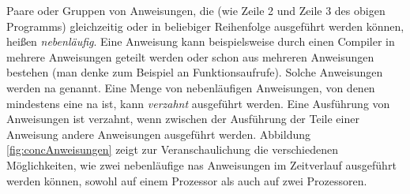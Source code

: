 \documentclass[12pt,a4paper,listof=totocnumbered,parskip=half]{scrreprt}
\begin{document}
Paare oder Gruppen von Anweisungen, die (wie Zeile 2 und Zeile 3 des obigen Programms) gleichzeitig oder in beliebiger Reihenfolge ausgeführt werden können, heißen \emph{nebenläufig}. Eine Anweisung kann beispielsweise durch einen Compiler in mehrere Anweisungen geteilt werden oder schon aus mehreren Anweisungen bestehen (man denke zum Beispiel an Funktionsaufrufe). Solche Anweisungen werden \gls{na} genannt. Eine Menge von nebenläufigen Anweisungen, von denen mindestens eine \gls{na} ist, kann \emph{verzahnt} ausgeführt werden. Eine Ausführung von Anweisungen ist verzahnt, wenn zwischen der Ausführung der Teile einer  Anweisung andere Anweisungen ausgeführt werden. Abbildung \ref{fig:concAnweisungen} zeigt zur Veranschaulichung die verschiedenen Möglichkeiten, wie zwei nebenläufige \glspl{na} Anweisungen im Zeitverlauf ausgeführt werden können, sowohl auf einem Prozessor als auch auf zwei Prozessoren. 
\end{document}
